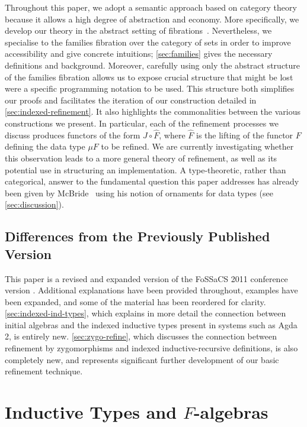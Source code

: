 \documentclass{LMCS}
\begin{document}
Throughout this paper, we adopt a semantic approach based on category
theory because it allows a high degree of abstraction and
economy. More specifically, we develop our theory in the abstract
setting of fibrations~\cite{jacobs99book}. Nevertheless, we specialise
to the families fibration over the category of sets in order to
improve accessibility and give concrete intuitions;
\autoref{sec:families} gives the necessary definitions and
background. Moreover, carefully using only the abstract structure of
the families fibration allows us to expose crucial structure that
might be lost were a specific programming notation to be used. This
structure both simplifies our proofs and facilitates the iteration of
our construction detailed in \autoref{sec:indexed-refinement}. It also
highlights the commonalities between the various constructions we
present. In particular, each of the refinement processes we discuss
produces functors of the form $J \circ \hat{F}$, where $\hat{F}$ is
the lifting of the functor $F$ defining the data type $\mu F$ to be
refined. We are currently investigating whether this observation leads
to a more general theory of refinement, as well as its potential use
in structuring an implementation. A type-theoretic, rather than
categorical, answer to the fundamental question this paper addresses
has already been given by McBride~\cite{mcbride10ornaments} using his
notion of ornaments for data types (see \autoref{sec:discussion}).

\subsection{Differences from the Previously Published Version}

This paper is a revised and expanded version of the FoSSaCS 2011
conference version \cite{atkey11refinement}. Additional explanations
have been provided throughout, examples have been expanded, and some
of the material has been reordered for
clarity. \autoref{sec:indexed-ind-types}, which explains in more
detail the connection between initial algebras and the indexed
inductive types present in systems such as Agda 2, is entirely
new. \autoref{sec:zygo-refine}, which discusses the connection between
refinement by zygomorphisms and indexed inductive-recursive
definitions, is also completely new, and represents significant
further development of our basic refinement technique.

\section{Inductive Types and $F$-algebras}\label{sec:f-algebras}
\end{document}
